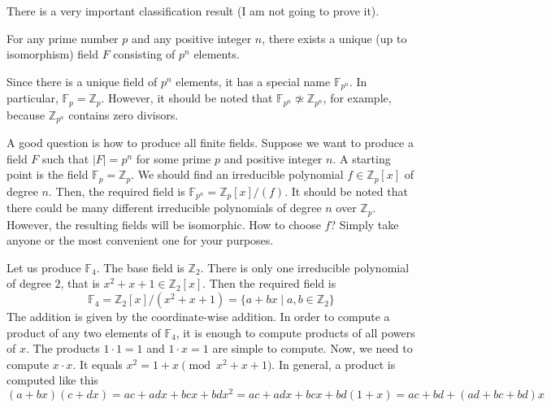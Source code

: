 There is a very important classification result (I am not going to prove it).

\begin{claim}
For any prime number $p$ and any positive integer $n$, there exists a unique (up to isomorphism) field $F$ consisting of $p^n$ elements.
\end{claim}

Since there is a unique field of $p^n$ elements, it has a special name $\mathbb F_{p^n}$.
In particular, $\mathbb F_p = \mathbb Z_p$.
However, it should be noted that $\mathbb F_{p^n}\not\simeq\mathbb Z_{p^n}$, for example, because $\mathbb Z_{p^n}$ contains zero divisors.

A good question is how to produce all finite fields.
Suppose we want to produce a field $F$ such that $|F| = p^n$ for some prime $p$ and positive integer $n$.
A starting point is the field $\mathbb F_p = \mathbb Z_p$.
We should find an irreducible polynomial $f\in \mathbb Z_p[x]$ of degree $n$.
Then, the required field is $\mathbb F_{p^n} = \mathbb Z_p[x]/(f)$.
It should be noted that there could be many different irreducible polynomials of degree $n$ over $\mathbb Z_p$.
However, the resulting fields will be isomorphic.
How to choose $f$?
Simply take anyone or the most convenient one for your purposes.

\begin{example}
Let us produce $\mathbb F_4$.
The base field is $\mathbb Z_2$.
There is only one irreducible polynomial of degree $2$, that is $x^2 + x + 1 \in \mathbb Z_2[x]$.
Then the required field is 
\[
\mathbb F_4 = \mathbb Z_2[x]/(x^2 + x + 1) = \{a + b x\mid a, b\in \mathbb Z_2\}
\]
The addition is given by the coordinate-wise addition.
In order to compute a product of any two elements of $\mathbb F_4$, it is enough to compute products of all powers of $x$.
The products $1\cdot 1 = 1$ and $1\cdot x = 1$ are simple to compute.
Now, we need to compute $x\cdot x$.
It equals $x^2 = 1 + x  \pmod{x^2 + x + 1}$.
In general, a product is computed like this
\[
(a+bx)(c+d x) = ac + ad x + bc x + bd x^2 = ac + ad x + bc x + bd (1+x) = ac + bd + (ad + bc + bd) x
\]
\end{example}

